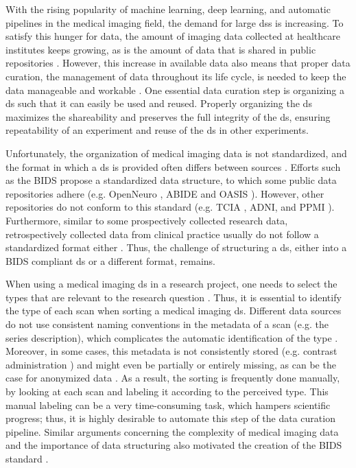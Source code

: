 With the rising popularity of machine learning, deep learning, and automatic pipelines in the medical imaging field, the demand for large \glspl{ds} is increasing.
To satisfy this hunger for data, the amount of imaging data collected at healthcare institutes keeps growing, as is the amount of data that is shared in public repositories \autocite{greenspan2016deep, lundervold2019overview}.
However, this increase in available data also means that proper data curation, the management of data throughout its life cycle, is needed to keep the data manageable and workable \autocite{prevedello2019challenges, vanooijen2019quality}.
One essential data curation step is organizing a \gls{ds} such that it can easily be used and reused.
Properly organizing the \gls{ds} maximizes the shareability and preserves the full integrity of the \gls{ds}, ensuring repeatability of an experiment and reuse of the \gls{ds} in other experiments.

Unfortunately, the organization of medical imaging data is not standardized, and the format in which a \gls{ds} is provided often differs between sources \autocite{lambin2017radiomics, vanooijen2019quality}.
Efforts such as the \gls{BIDS} \autocite{gorgolewski2016brain} propose a standardized data structure, to which some public data repositories adhere (e.g. OpenNeuro \autocite{gorgolewski2017openneuro}, \gls{ABIDE} \autocite{dimartino2017enhancing} and \gls{OASIS} \autocite{lamontagne2018oasis}).
However, other repositories do not conform to this standard (e.g. \gls{TCIA} \autocite{clark2013cancer}, \gls{ADNI}, and \gls{PPMI} \autocite{marek2018parkinson}).
Furthermore, similar to some prospectively collected research data, retrospectively collected data from clinical practice usually do not follow a standardized format either \autocite{vanooijen2019quality}.
Thus, the challenge of structuring a \gls{ds}, either into a \gls{BIDS} compliant \gls{ds} or a different format, remains.

When using a medical imaging \gls{ds} in a research project, one needs to select the \glspl{type} that are relevant to the research question \autocite{montagnon2020deep, lambin2017radiomics}.
Thus, it is essential to identify the \gls{type} of each \gls{scan} when sorting a medical imaging \gls{ds}.
Different data sources do not use consistent naming conventions in the metadata of a \gls{scan} (e.g. the series description), which complicates the automatic identification of the \gls{type} \autocite{vanooijen2019quality, wang2011automated}.
Moreover, in some cases, this metadata is not consistently stored (e.g. contrast administration \autocite{hirsch2015we}) and might even be partially or entirely missing, as can be the case for anonymized data \autocite{moore2015identification}.
As a result, the sorting is frequently done manually, by looking at each \gls{scan} and labeling it according to the perceived \gls{type}.
This manual labeling can be a very time-consuming task, which hampers scientific progress; thus, it is highly desirable to automate this step of the data curation pipeline.
Similar arguments concerning the complexity of medical imaging data and the importance of data structuring also motivated the creation of the \gls{BIDS} standard \autocite{gorgolewski2016brain}.

